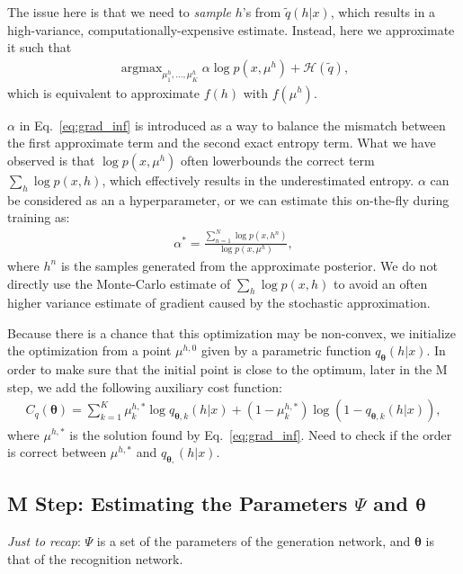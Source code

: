 \documentclass{article}
\newcommand{\vects}[1]{\boldsymbol{#1}}
\newcommand{\TT}[0]{\vects{\theta}}
\newcommand{\HH}[0]{\mathcal{H}}
\DeclareMathOperator*{\argmax}{\arg \max}
\begin{document}
The issue here is that we need to {\em sample} $h$'s from $\tilde{q}(h|x)$,
which results in a high-variance, computationally-expensive estimate. Instead,
here we approximate it such that
\begin{align}
    \label{eq:grad_inf}
    \argmax_{\mu^h_1, \ldots, \mu^h_K} 
    \alpha \log p(x,\mu^h) + \HH(\tilde{q}),
\end{align}
which is equivalent to approximate $f(h)$ with $f(\mu^h)$. 

$\alpha$ in Eq.~\eqref{eq:grad_inf} is introduced as a way to balance the
mismatch between the first approximate term and the second exact entropy term.
What we have observed is that $\log p(x, \mu^h)$ often lowerbounds the correct
term $\sum_h \log p(x, h)$, which effectively results in the underestimated
entropy. $\alpha$ can be considered as an a hyperparameter, or we can estimate
this on-the-fly during training as:
\begin{align*}
    \alpha^* = \frac{\sum_{n=1}^N \log p(x, h^n)}{\log p(x, \mu^h)},
\end{align*}
where $h^n$ is the samples generated from the approximate posterior.  We do not
directly use the Monte-Carlo estimate of $\sum_h \log p(x, h)$ to avoid an
often higher variance estimate of gradient caused by the stochastic
approximation.

Because there is a chance that this optimization may be non-convex, we
initialize the optimization from a point $\mu^{h,0}$ given by a parametric
function $q_{\TT}(h|x)$. In order to make sure that the initial point is close
to the optimum, later in the M step, we add the following auxiliary cost
function:
\begin{align}
    \label{eq:c_q}
    C_q(\TT) = \sum_{k=1}^K \mu^{h,*}_k\log q_{\TT,k}(h|x) + 
    (1 - \mu^{h,*}_k)\log (1 - q_{\TT,k}(h|x)),
\end{align}
where $\mu^{h,*}$ is the solution found by Eq.~\eqref{eq:grad_inf}. {\color{red}
    Need to check if the order is correct between $\mu^{h,*}$ and
$q_{\TT,}(h|x)$.}

\subsection{M Step: Estimating the Parameters $\Psi$ and $\TT$}

{\em Just to recap}: $\Psi$ is a set of the parameters of the generation
network, and $\TT$ is that of the recognition network.
\end{document}

